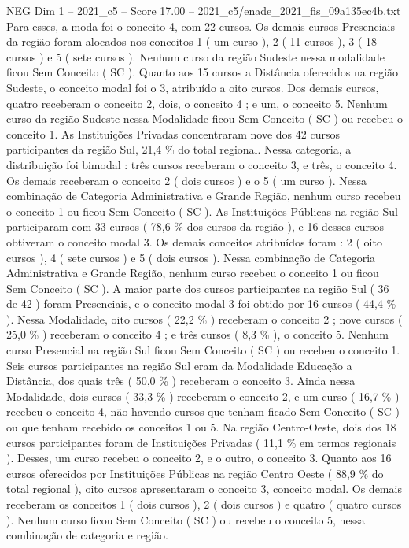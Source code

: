 \begin{textsample}{NEG Dim 1 – 2021\_c5 – Score 17.00 – 2021\_c5/enade\_2021\_fis\_09a135ec4b.txt}
Para esses, a moda foi o conceito 4, com 22 cursos.
Os demais cursos Presenciais da região foram alocados nos conceitos 1 ( um curso ), 2 ( 11 cursos ), 3 ( 18 cursos ) e 5 ( sete cursos ).
Nenhum curso da região Sudeste nessa modalidade ficou Sem Conceito ( SC ).
Quanto aos 15 cursos a Distância oferecidos na região Sudeste, o conceito modal foi o 3, atribuído a oito cursos.
Dos demais cursos, quatro receberam o conceito 2, dois, o conceito 4 ; e um, o conceito 5.
Nenhum curso da região Sudeste nessa Modalidade ficou Sem Conceito ( SC ) ou recebeu o conceito 1.
As Instituições Privadas concentraram nove dos 42 cursos participantes da região Sul, 21,4 \% do total regional.
Nessa categoria, a distribuição foi bimodal : três cursos receberam o conceito 3, e três, o conceito 4.
Os demais receberam o conceito 2 ( dois cursos ) e o 5 ( um curso ).
Nessa combinação de Categoria Administrativa e Grande Região, nenhum curso recebeu o conceito 1 ou ficou Sem Conceito ( SC ).
As Instituições Públicas na região Sul participaram com 33 cursos ( 78,6 \% dos cursos da região ), e 16 desses cursos obtiveram o conceito modal 3.
Os demais conceitos atribuídos foram : 2 ( oito cursos ), 4 ( sete cursos ) e 5 ( dois cursos ).
Nessa combinação de Categoria Administrativa e Grande Região, nenhum curso recebeu o conceito 1 ou ficou Sem Conceito ( SC ).
A maior parte dos cursos participantes na região Sul ( 36 de 42 ) foram Presenciais, e o conceito modal 3 foi obtido por 16 cursos ( 44,4 \% ).
Nessa Modalidade, oito cursos ( 22,2 \% ) receberam o conceito 2 ; nove cursos ( 25,0 \% ) receberam o conceito 4 ; e três cursos ( 8,3 \% ), o conceito 5.
Nenhum curso Presencial na região Sul ficou Sem Conceito ( SC ) ou recebeu o conceito 1.
Seis cursos participantes na região Sul eram da Modalidade Educação a Distância, dos quais três ( 50,0 \% ) receberam o conceito 3.
Ainda nessa Modalidade, dois cursos ( 33,3 \% ) receberam o conceito 2, e um curso ( 16,7 \% ) recebeu o conceito 4, não havendo cursos que tenham ficado Sem Conceito ( SC ) ou que tenham recebido os conceitos 1 ou 5.
Na região Centro-Oeste, dois dos 18 cursos participantes foram de Instituições Privadas ( 11,1 \% em termos regionais ).
Desses, um curso recebeu o conceito 2, e o outro, o conceito 3.
Quanto aos 16 cursos oferecidos por Instituições Públicas na região Centro Oeste ( 88,9 \% do total regional ), oito cursos apresentaram o conceito 3, conceito modal.
Os demais receberam os conceitos 1 ( dois cursos ), 2 ( dois cursos ) e quatro ( quatro cursos ).
Nenhum curso ficou Sem Conceito ( SC ) ou recebeu o conceito 5, nessa combinação de categoria e região.

\end{textsample}
